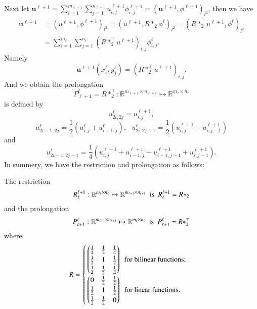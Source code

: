 Next 
let $\mathbf u^{\ell+1}=\sum\limits_{i=1}^{m_{\ell+1}}\sum\limits_{j=1}^{n_{\ell+1}}u_{i,j}^{\ell+1}\phi^{\ell+1}_{i,j}
=( \mathbf u^{\ell+1}, \phi^{\ell+1})_{l^2}$, then we have
\begin{equation}
\begin{split}
\mathbf u^{\ell+1}&=( u^{\ell+1}, \phi^{\ell+1})_{l^2}
=( u^{\ell+1}, R\ast_2\phi^{\ell})_{l^2}=(R\ast_2^{\top} u^{\ell+1}, \phi^{\ell})_{l^2}\\
&=\sum\limits_{i=1}^{m_{\ell}}\sum\limits_{j=1}^{n_{\ell}}\left(R\ast_2^{\top} u^{\ell+1}\right)_{i,j}\phi^{\ell}_{i,j}.
\end{split}
\end{equation}
Namely
$$
\mathbf u^{\ell+1}(x_i^\ell,y_j^\ell)=\left(R\ast_2^{\top} u^{\ell+1}\right)_{i,j}.
$$
And we obtain the prolongation 
$$
P_{\ell+1}^\ell=R\ast_2^{\top} : \mathbb R^{m_{\ell+1}\times n_{\ell+1}}\mapsto  \mathbb R^{m_{\ell}\times n_{\ell} }
$$
is defined by 
$$
u^\ell_{2i,2j}=u^{\ell+1}_{i,j},
$$
$$
u^\ell_{2i-1,2j}=\frac{1}{2}(u^\ell_{i,j}+u^\ell_{i-1,j}),~~~ u^\ell_{2i,2j-1}=\frac{1}{2}(u^{\ell+1}_{i,j}+u^{\ell+1}_{i,j-1})
$$
and 
$$
u^\ell_{2i-1,2j-1}=\frac{1}{4}(u^{\ell+1}_{i,j}+u^{\ell+1}_{i-1,j}+u^{\ell+1}_{i-1,j-1}+u^{\ell+1}_{i,j-1}).
$$
In summery, we have the restriction and prolongation as follows: 
\begin{lemma}\label{ris:plon}
The restriction 
$$
R^{\ell+1}_\ell: \mathbb R^{m_\ell\times n_\ell}\mapsto  \mathbb R^{m_{\ell+1}\times n_{\ell+1}}~~\hbox{is}~~ R^{\ell+1}_\ell = R\ast_2  
$$ 
and the prolongation
$$
P_{\ell+1}^{\ell}: \mathbb R^{m_{\ell+1}\times n_{\ell+1}}\mapsto  \mathbb R^{m_{\ell}\times n_{\ell} } ~~\hbox{is}~~ P^{\ell}_{\ell+1} =R\ast_2^{\top} 
$$
where 
\begin{equation}\label{bi-restrict1}
R=
\begin{cases}
	\begin{pmatrix}
	\frac{1}{4} &\frac{1}{2}&\frac{1}{4}\\
	\frac{1}{2}& 1&\frac{1}{2}\\
	\frac{1}{4}&\frac{1}{2}&  \frac{1}{4} 
	\end{pmatrix}
	\hbox{~~for bilinear functions};\\
	\begin{pmatrix}
	0 &\frac{1}{2}&\frac{1}{2}\\
	\frac{1}{2}& 1&\frac{1}{2}\\
	\frac{1}{2}&\frac{1}{2}&  0
	\end{pmatrix}
	\hbox{~~for linear functions}.
	\end{cases}
	\end{equation}	
\end{lemma}

